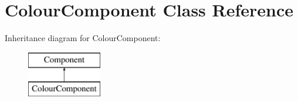 \hypertarget{class_colour_component}{}\section{Colour\+Component Class Reference}
\label{class_colour_component}
Inheritance diagram for Colour\+Component\+:\begin{figure}[H]
\begin{center}
\leavevmode
\includegraphics[height=2.000000cm]{class_colour_component}
\end{center}
\end{figure}
